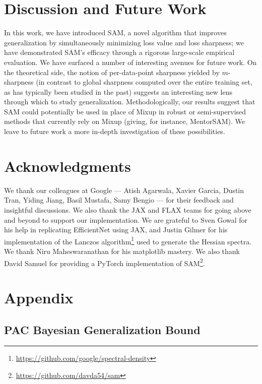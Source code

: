 \documentclass{article} %
\begin{document}
\section{Discussion and Future Work}
In this work, we have introduced SAM, a novel algorithm that improves generalization by simultaneously minimizing loss value and loss sharpness; we have demonstrated SAM's efficacy through a rigorous large-scale empirical evaluation. We have surfaced a number of interesting avenues for future work. On the theoretical side, the notion of per-data-point sharpness yielded by $m$-sharpness (in contrast to global sharpness computed over the entire training set, as has typically been studied in the past) suggests an interesting new lens through which to study generalization.  Methodologically, our results suggest that SAM could potentially be used in place of Mixup in robust or semi-supervised methods that currently rely on Mixup (giving, for instance, MentorSAM). We leave to future work a more in-depth investigation of these possibilities.

\section{Acknowledgments}

We thank our colleagues at Google --- Atish Agarwala, Xavier Garcia, Dustin Tran, Yiding Jiang, Basil Mustafa, Samy Bengio --- for their feedback and insightful discussions. We also thank the JAX and FLAX teams for going above and beyond to support our implementation. We are grateful to Sven Gowal for his help in replicating EfficientNet using JAX, and Justin Gilmer for his implementation
of the Lanczos algorithm\footnote{\url{https://github.com/google/spectral-density}} used to generate the Hessian spectra.  
We thank Niru Maheswaranathan for his matplotlib mastery. We also thank David Samuel for providing a PyTorch implementation of SAM\footnote{\url{https://github.com/davda54/sam}}.




\newpage
\appendix
\section{Appendix}
\label{appendix:theorem}
\subsection{PAC Bayesian Generalization Bound}
\end{document}
